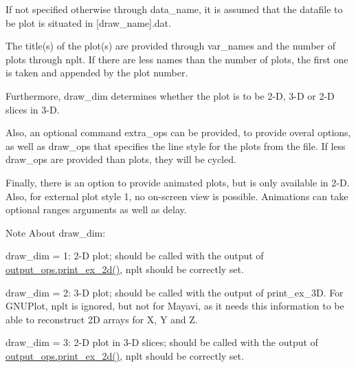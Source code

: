 If not specified otherwise through data\+\_\+name, it is assumed that the datafile to be plot is situated in {\ttfamily \mbox{[}draw\+\_\+name\mbox{]}.dat}.

The title(s) of the plot(s) are provided through {\ttfamily var\+\_\+names} and the number of plots through {\ttfamily nplt}. If there are less names than the number of plots, the first one is taken and appended by the plot number.

Furthermore, {\ttfamily draw\+\_\+dim} determines whether the plot is to be 2-\/D, 3-\/D or 2-\/D slices in 3-\/D.

Also, an optional command {\ttfamily extra\+\_\+ops} can be provided, to provide overal options, as well as draw\+\_\+ops that specifies the line style for the plots from the file. If {\ttfamily less} draw\+\_\+ops are provided than plots, they will be cycled.

Finally, there is an option to provide animated plots, but is only available in 2-\/D. Also, for external plot style 1, no on-\/screen view is possible. Animations can take optional ranges arguments as well as delay. \begin{DoxyNote}{Note}
{\ttfamily About} draw\+\_\+dim\+:
\begin{DoxyItemize}
\item {\ttfamily draw\+\_\+dim} = 1\+: 2-\/D plot; should be called with the output of \hyperlink{interfaceoutput__ops_1_1print__ex__2d}{output\+\_\+ops.\+print\+\_\+ex\+\_\+2d()}, {\ttfamily nplt} should be correctly set.
\item {\ttfamily draw\+\_\+dim} = 2\+: 3-\/D plot; should be called with the output of print\+\_\+ex\+\_\+3D. For G\+N\+U\+Plot, {\ttfamily nplt} is ignored, but not for Mayavi, as it needs this information to be able to reconstruct 2D arrays for X, Y and Z.
\item {\ttfamily draw\+\_\+dim} = 3\+: 2-\/D plot in 3-\/D slices; should be called with the output of \hyperlink{interfaceoutput__ops_1_1print__ex__2d}{output\+\_\+ops.\+print\+\_\+ex\+\_\+2d()}, {\ttfamily nplt} should be correctly set.
\end{DoxyItemize}
\end{DoxyNote}

